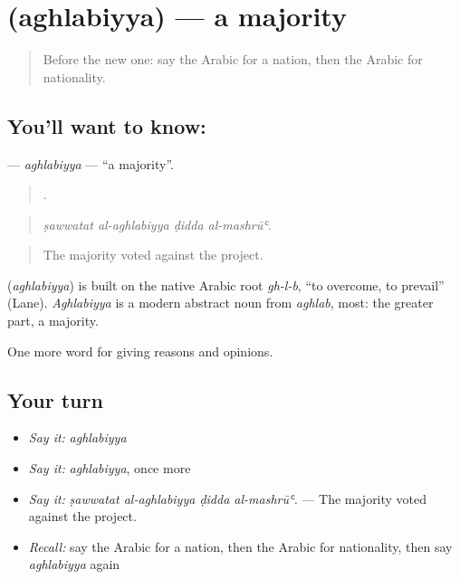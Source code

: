 \section[\texorpdfstring{\ar{أغلبية} (aghlabiyya)}{أغلبية (aghlabiyya)}]{ (aghlabiyya) — a majority}

\label{lesson:AR-C387-aghlabiyya}



\begin{quote}
Before the new one: say the Arabic for a nation, then the Arabic for nationality.
\end{quote}

\subsection*{You'll want to know: }
\textbf{} — \emph{aghlabiyya} — \textquotedblleft{}a majority\textquotedblright{}.

\begin{quote}
   .
\end{quote}

\begin{quote}
\emph{ṣawwatat al-aghlabiyya ḍidda al-mashrūʿ.}
\end{quote}

\begin{quote}
The majority voted against the project.
\end{quote}

\begin{cousinweb}
\textbf{} (\emph{aghlabiyya}) is built on the native Arabic root \emph{gh-l-b}, \textquotedblleft{}to overcome, to prevail\textquotedblright{} (Lane). \emph{Aghlabiyya} is a modern abstract noun from \emph{aghlab}, most: the greater part, a majority.
\end{cousinweb}

\begin{grammarlens}[title={What you've built}]
One more word for giving reasons and opinions.
\end{grammarlens}

\subsection*{Your turn}
\begin{itemize}
\raggedright
  \item \emph{Say it:} \emph{aghlabiyya}
  \item \emph{Say it:} \emph{aghlabiyya}, once more
  \item \emph{Say it:} \emph{ṣawwatat al-aghlabiyya ḍidda al-mashrūʿ.} — The majority voted against the project.
  \item \emph{Recall:} say the Arabic for a nation, then the Arabic for nationality, then say \emph{aghlabiyya} again
\end{itemize}

